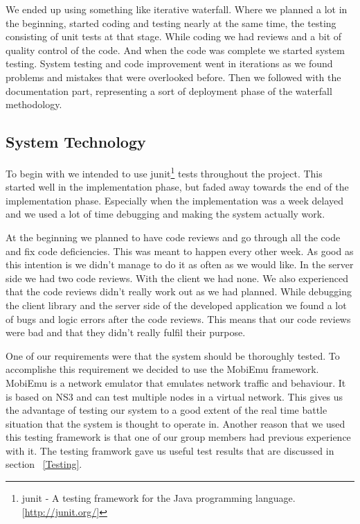     We ended up using something like iterative waterfall. Where we planned a lot in the beginning, started coding and testing nearly at the same time, the testing consisting of unit tests at that stage. While coding we had reviews and a bit of quality control of the code. And when the code was complete we started system testing. System testing and code improvement went in iterations as we found problems and mistakes that were overlooked before. Then we followed with the documentation part, representing a sort of deployment phase of the waterfall methodology. 

    \subsection{System Technology}\label{System Technology}
    
    To begin with we intended to use \gls{junit}\footnote{\gls{junit} - A testing framework for the Java programming language. [\url{http://junit.org/}]} tests throughout the project. This started well in the implementation phase, but faded away towards the end of the implementation phase. Especially when the implementation was a week delayed and we used a lot of time debugging and making the system actually work. 
    
    At the beginning we planned to have code reviews and go through all the code and fix code deficiencies. This was meant to happen every other week. As good as this intention is we didn't manage to do it as often as we would like. In the server side we had two code reviews. With the client we had none. We also experienced that the code reviews didn't really work out as we had planned. While debugging the client library and the server side of the developed application we found a lot of bugs and logic errors after the code reviews. This means that our code reviews were bad and that they didn't really fulfil their purpose. 
    
    One of our requirements were that the system should be thoroughly tested. To accomplishe this requirement we decided to use the MobiEmu framework. MobiEmu is a network emulator that emulates network traffic and behaviour. It is based on NS3 and can test multiple nodes in a virtual network. This gives us the advantage of testing our system to a good extent of the real time battle situation that the system is thought to operate in. Another reason that we used this testing framework is that one of our group members had previous experience with it. The testing framwork gave us useful test results that are discussed in section ~\ref{Testing}.

